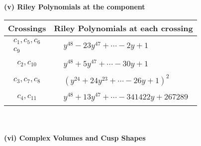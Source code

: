 \documentclass[1p]{elsarticle_modified}
\theoremstyle{definition}
\begin{document}
\newpage\renewcommand{\arraystretch}{1}
\flushleft \textbf{(v) Riley Polynomials at the component}\newline \\
\begin{tabular}{m{50pt}|m{274pt}}
Crossings & \hspace{64pt}Riley Polynomials at each crossing \\
\hline $$\begin{aligned}c_{1},c_{5},c_{6}\\c_{9}\end{aligned}$$&$\begin{aligned}
&y^{48}-23 y^{47}+\cdots-2 y+1
\end{aligned}$\\
\hline $$\begin{aligned}c_{2},c_{10}\end{aligned}$$&$\begin{aligned}
&y^{48}+5 y^{47}+\cdots-30 y+1
\end{aligned}$\\
\hline $$\begin{aligned}c_{3},c_{7},c_{8}\end{aligned}$$&$\begin{aligned}
&(y^{24}+24 y^{23}+\cdots-26 y+1)^{2}
\end{aligned}$\\
\hline $$\begin{aligned}c_{4},c_{11}\end{aligned}$$&$\begin{aligned}
&y^{48}+13 y^{47}+\cdots-341422 y+267289
\end{aligned}$\\
\hline
\end{tabular}\\~\\
\newpage\flushleft \textbf{(vi) Complex Volumes and Cusp Shapes}
\end{document}
